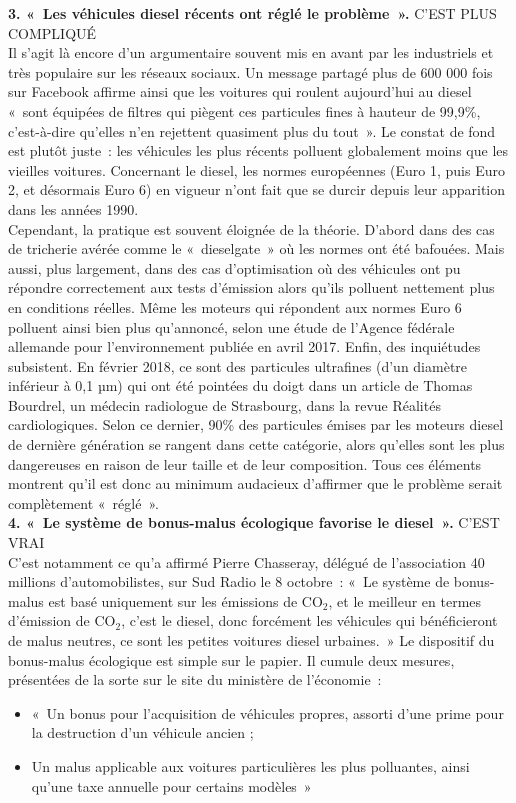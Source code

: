 \documentclass[8pt]{article}
\begin{document}
\textbf{3. «~Les véhicules diesel récents ont réglé le problème~».} C’EST PLUS COMPLIQUÉ\\

Il s’agit là encore d’un argumentaire souvent mis en avant par les industriels et très populaire sur les réseaux sociaux. Un message partagé plus de 600 000 fois sur Facebook affirme ainsi que les voitures qui roulent aujourd’hui au diesel «~sont équipées de filtres qui piègent ces particules fines à hauteur de 99,9\%, c’est-à-dire qu’elles n’en rejettent quasiment plus du tout~».
Le constat de fond est plutôt juste~: les véhicules les plus récents polluent globalement moins que les vieilles voitures. Concernant le diesel, les normes européennes (Euro 1, puis Euro 2, et désormais Euro 6) en vigueur n’ont fait que se durcir depuis leur apparition dans les années 1990.\\

Cependant, la pratique est souvent éloignée de la théorie. D’abord dans des cas de tricherie avérée comme le «~dieselgate~» où les normes ont été bafouées. Mais aussi, plus largement, dans des cas d’optimisation où des véhicules ont pu répondre correctement aux tests d’émission alors qu’ils polluent nettement plus en conditions réelles. Même les moteurs qui répondent aux normes Euro 6 polluent ainsi bien plus qu’annoncé, selon une étude de l’Agence fédérale allemande pour l’environnement publiée en avril 2017.
Enfin, des inquiétudes subsistent. En février 2018, ce sont des particules ultrafines (d’un diamètre inférieur à 0,1 µm) qui ont été pointées du doigt dans un article de Thomas Bourdrel, un médecin radiologue de Strasbourg, dans la revue Réalités cardiologiques. Selon ce dernier, 90\% des particules émises par les moteurs diesel de dernière génération se rangent dans cette catégorie, alors qu’elles sont les plus dangereuses en raison de leur taille et de leur composition.
Tous ces éléments montrent qu’il est donc au minimum audacieux d’affirmer que le problème serait complètement «~réglé~».\\

\textbf{4. «~Le système de bonus-malus écologique favorise le diesel~».} C’EST VRAI\\

C’est notamment ce qu’a affirmé Pierre Chasseray, délégué de l’association 40 millions d’automobilistes, sur Sud Radio le 8 octobre~: «~Le système de bonus-malus est basé uniquement sur les émissions de CO$_2$, et le meilleur en termes d’émission de CO$_2$, c’est le diesel, donc forcément les véhicules qui bénéficieront de malus neutres, ce sont les petites voitures diesel urbaines.~»
Le dispositif du bonus-malus écologique est simple sur le papier. Il cumule deux mesures, présentées de la sorte sur le site du ministère de l’économie~:
\begin{itemize}
	\setlength\itemsep{-0.1em}
	\item «~Un bonus pour l’acquisition de véhicules propres, assorti d’une prime pour la destruction d’un véhicule ancien ;
	\item Un malus applicable aux voitures particulières les plus polluantes, ainsi qu’une taxe annuelle pour certains modèles~»
\end{itemize}
\end{document}
